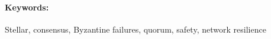 \documentclass[12pt, twoside]{book}
\begin{document}
\paragraph*{Keywords:}  Stellar, consensus, Byzantine failures,
quorum, safety, network resilience


%
%



\newpage 

\tableofcontents



\newpage 

\listoffigures


\mainmatter


 















\newpage	

\backmatter

\thispagestyle{empty}
\nocite{*}
\clearpage




 
\end{document}
